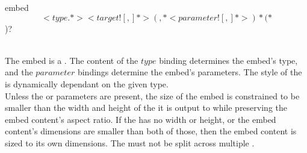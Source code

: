 \begin{identifier}{embed}
\[ <type .*> <target ![,]*>(, *<parameter ![,]*>)*( *\])?
\end{identifier}
 \\

The embed is a . The content of the \inline$type$ binding determines the embed's type, and the \inline$parameter$ bindings determine the embed's parameters. The style of the  is dynamically dependant on the given type. \\

Unless the  or  parameters are present, the size of the embed  is constrained to be smaller than the width and height of the  it is output to while preserving the embed content's aspect ratio. If the  has no width or height, or the embed content's dimensions are smaller than both of those, then the embed content is sized to its own dimensions. The  must not be split across multiple .\\




